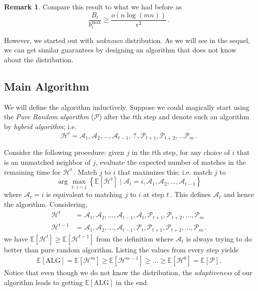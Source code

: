 \documentclass[lecture,11pt,]{pcms-l}
\numberwithin{equation}{section}
\theoremstyle{plain}
\theoremstyle{definition}
\newtheorem*{remark}{Remark}
\newcommand{\beqa}{\begin{equation} \begin{aligned}}
\newcommand{\eeqa}{\end{aligned} \end{equation}}
\newcommand{\beqas}{\begin{equation*} \begin{aligned}}
\newcommand{\eeqas}{\end{aligned} \end{equation*}}
\newcommand{\bnum}{\begin{enumerate}}
\newcommand{\enum}{\end{enumerate}}
\renewcommand{\H}{\mathcal{H}}
\newcommand{\A}{\mathcal{A}}
\newcommand{\Pc}{\mathcal{P}}
\newcommand{\E}{\mathbb{E}}
\newcommand{\B}{B}
\newcommand{\alg}{\textrm{ALG}}
\begin{document}
\begin{remark}
Compare this result to what we had before as
\[
\frac{\B_i}{b_i^{\text{max}}} \geq \frac{o(n \log(mn))}{\epsilon^2}\,.
\]
\end{remark}

However, we started out with \emph{unknown} distribution. As we will see in the sequel, we can get similar guarantees by designing an algorithm that does not know about the distribution. 


\subsection{Main Algorithm}
We will define the algorithm inductively. Suppose we could magically start using the \emph{Pure Random algorithm} ($\Pc$) after the $t$th step and denote such an algorithm by \emph{hybrid algorithm}; i.e.
\[
\H^t = \A_1, \A_2, \ldots, \A_{t-1},\, ?\, , \Pc_{t+1}, \Pc_{t+2}, \ldots \Pc_m \,.
\]

Consider the following procedure: given $j$ in the $t$th step, for any choice of $i$ that is an unmatched neighbor of $j$, evaluate the expected number of matches in the remaining time for $\H^t\,$. Match $j$ to $i$ that maximizes this; i.e. match $j$ to
%
%
%
\[
\arg\max_{i:\, i\sim j} \left\{  \E[\H^t] \mid \A_t = i , \A_1,\A_2,\ldots, \A_{t-1} \right\}
\]
where $\A_t=i$ is equivalent to matching $j$ to $i$ at step $t\,$. %
This defines $\A_t$ and hence the algorithm. Considering,
\beqas
\H^t &= \A_1, \A_2, \ldots, \A_{t-1}, \A_t , \Pc_{t+1}, \Pc_{t+2}, \ldots , \Pc_m\\
\H^{t-1} &= \A_1, \A_2, \ldots, \A_{t-1}, \Pc_t , \Pc_{t+1}, \Pc_{t+2}, \ldots , \Pc_m \,.
\eeqas
we have $\E\left[\H^t\right]  \geq \E\left[\H^{t-1}\right]$ from the definition where $\A_t$ is always trying to do better than pure random algorithm. 
Listing the values from every step yields
\beqa
\E[\alg] = \E\left[\H^m\right]  \geq \E\left[\H^{m-1}\right] \geq \ldots  \geq \E\left[\H^{0}\right] = \E[\Pc].
\eeqa
Notice that even though we do not know the distribution, the \emph{adaptiveness} of our algorithm leads to getting $\E[\alg]$ in the end. \medskip
\end{document}
